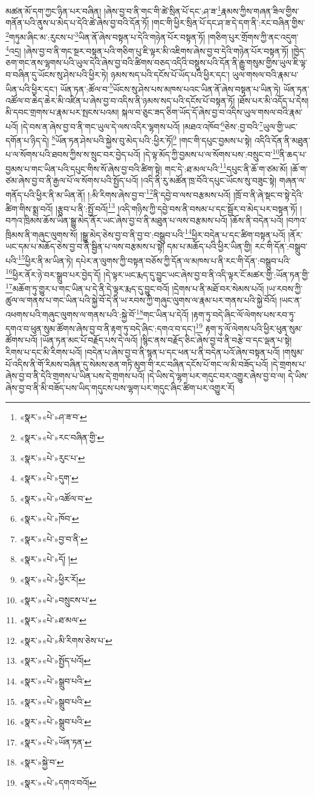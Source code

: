 མཚན་མོ་དག་ཀྱང་ཉིན་པར་བཞིན། །ཞེས་བྱ་བ་ནི་གང་གི་ཚེ་སྲིན་པོ་དང་:ཤ་ཟ་\footnote{«སྣར་»«པེ་»ཤ་ཟ་བ་}རྣམས་ཀྱིས་གཞན་ཟིལ་གྱིས་གནོན་པའི་ནུས་པ་མེད་པ་དེའི་ཚེ་ཞེས་བྱ་བའི་དོན་ཏོ། །གང་གི་ཕྱིར་སྲིན་པོ་དང་ཤ་ཟ་དེ་དག་ནི་:རང་བཞིན་གྱིས་\footnote{«སྣར་»«པེ་»རང་བཞིན་གྱི་}གཏུམ་ཞིང་མ་:རུངས་པ་\footnote{«སྣར་»«པེ་»རུང་པ་}ཡིན་ནོ་ཞེས་བསྟན་པ་དེའི་གཉེན་པོར་བསྟན་ཏོ། །གཅིག་པུར་གྲོགས་ཀྱི་ནང་འདུག་\footnote{«སྣར་»«པེ་»དུག་}འདྲ། །ཞེས་བྱ་བ་ནི་གང་སྔར་བསྟན་པའི་གཅིག་པུ་ཇི་ལྟར་མི་འཇིགས་ཞེས་བྱ་བ་དེའི་གཉེན་པོར་བསྟན་ཏོ། །ཁྱེད་ཅག་གང་ནས་ལྷགས་པའི་ཡུལ་དེའི་ཞེས་བྱ་བའི་ཚིགས་བཅད་འདིའི་བསྡུས་པའི་དོན་ནི་རྒྱུ་གསུམ་གྱིས་ཡུལ་ཇི་ལྟ་བ་བཞིན་དུ་ཡོངས་སུ་ཤེས་པའི་ཕྱིར་ཏེ། ཉམས་སད་པའི་དངོས་པོ་ཡོད་པའི་ཕྱིར་དང་། ཡུལ་གསལ་བའི་རྣམ་པ་ཡིན་པའི་ཕྱིར་དང་། ཡོན་ཏན་:ཚོལ་བ་\footnote{«སྣར་»«པེ་»འཚོལ་བ་}ཡོངས་སུ་ཤེས་པས་མཁས་པའང་ཡིན་ནོ་ཞེས་བསྟན་པ་ཡིན་ཏེ། ཡོན་ཏན་འཚོལ་བ་ཆེད་ཆེར་མི་འཛིན་པ་ཞེས་བྱ་བ་འདིས་ནི་ཉམས་སད་པའི་དངོས་པོ་བསྟན་ཏོ། །ཐོས་པར་མི་འདོད་པ་དེས། མི་དབང་གྲགས་པ་རྣམ་པར་སྤངས་པའམ། སྐལ་བ་ཅུང་ཟད་ཅིག་ཡོད་དོ་ཞེས་བྱ་བ་འདིས་ཡུལ་གསལ་བའི་རྣམ་པའོ། །དེ་བས་ན་ཞེས་བྱ་བ་ནི་གང་ཡུལ་དེ་ལས་འདིར་ལྷགས་པའོ། །མཐའ་འཁོབ་\footnote{«སྣར་»«པེ་»ཁོབ་}ཅེས་:བྱ་བའི་\footnote{«སྣར་»«པེ་»བྱ་བ་ནི་}ཡུལ་གྱི་ཡང་དགོན་པ་ཉིད་དེ། \footnote{«སྣར་»«པེ་»དོ། ། }ཡོན་ཏན་ཤེས་པའི་སྐྱེས་བུ་མེད་པའི་:ཕྱིར་ཏོ།\footnote{«སྣར་»«པེ་»ཕྱིར་རོ།} །གང་གི་དཔུང་བྱམས་པ་སྟེ། འདིའི་དོན་ནི་མཐུན་པ་ལ་སོགས་པའི་ཐབས་ཀྱིས་ས་སྲུང་བར་བྱེད་པའོ། །དེ་ལྟ་མོད་ཀྱི་བྱམས་པ་ལ་སོགས་པས་:བསྲུང་བ་\footnote{«སྣར་»«པེ་»བསྲུངས་པ་}ནི་ཆད་པ་བྱམས་པ་གང་ཡིན་པའི་དཔུང་གིས་སོ་ཞེས་བྱ་བའི་ཚིག་སྟེ། གང་དེ་:ཐ་མལ་པའི་\footnote{«སྣར་»«པེ་»ཐ་མལ་}དཔུང་ནི་ཆོ་ག་ཙམ་མོ། །ཆོ་ག་ཙམ་ཞེས་བྱ་བ་ནི་རྒྱལ་པོ་ལ་སོགས་པའི་སྤྱོད་པའོ། །འདི་ནི་རུ་མཚོན་ཁྲ་བོའི་དཔུང་ཡོངས་སུ་བཟུང་སྟེ། གཞན་ལ་གནོད་པའི་ཕྱིར་ནི་མ་ཡིན་ནོ། །:མི་རིགས་ཞེས་བྱ་བ་\footnote{«སྣར་»«པེ་»མི་རིགས་ཅེས་པ་}ནི་དབྱེ་བ་ལས་བརྩམས་པའོ། །ཁྲོ་བ་ནི་ཞེ་སྡང་བ་སྟེ་དེའི་ཚིག་གིས་སྨྲ་བའོ། །རྩུབ་པ་ནི་:སྤྱོ་བའོ།\footnote{«སྣར་»«པེ་»སྤྱོད་པའོ།} །འདི་གཉིས་ཀྱི་དབྱེ་བས་ནི་བསམ་པ་དང་སྦྱོར་བ་མེད་པར་བསྟན་ཏོ། །བཀའ་ཁྲིམས་ཆོས་ཡིན་སྒྱུ་མེད་ནོར་ཡང་ཞེས་བྱ་བ་ནི་མཐུན་པ་ལས་བརྩམས་པའོ། །ཆོས་ནི་བདེན་པའོ། །བཀའ་ཁྲིམས་ནི་གཞུང་ལུགས་སོ། །སྒྱུ་མེད་ཅེས་བྱ་བ་ནི་བྱ་བ་:བསྒྲུབ་པའི་\footnote{«སྣར་»«པེ་»སྒྲུབ་པའི་}ཕྱིར་བདེན་པ་དང་ཚིག་བསྟན་པའོ། །ནོར་ཡང་དམ་པ་མཆོད་ཅེས་བྱ་བ་ནི་སྦྱིན་པ་ལས་བརྩམས་པ་སྟེ། དམ་པ་མཆོད་པའི་ཕྱིར་ཡིན་གྱི། རང་གི་དོན་:བསྒྲུབ་པའི་\footnote{«སྣར་»«པེ་»སྒྲུབ་པའི་}ཕྱིར་ནི་མ་ཡིན་ཏེ། དཔེར་ན་ལུགས་ཀྱི་བསྟན་བཅོས་ཀྱི་དོན་ལ་མཁས་པ་ནི་རང་གི་དོན་:བསྒྲུབ་པའི་\footnote{«སྣར་»«པེ་»སྒྲུབ་པའི་}ཕྱིར་ནོར་ཉེ་བར་སྒྲུབ་པར་བྱེད་དོ། །དེ་ལྟར་ཡང་རྨད་དུ་བྱུང་ཡང་ཞེས་བྱ་བ་ནི་འདི་ལྟར་ངོ་མཚར་གྱི་:ཡོན་ཏན་གྱི་\footnote{«སྣར་»«པེ་»ཡོན་ཏན་}མཆོག་ཏུ་གྱུར་པ་གང་ཡིན་པ་དེ་ནི་དེ་ལྟར་རྨད་དུ་བྱུང་བའོ། །དྲེགས་པ་ནི་མཐོ་བར་སེམས་པའོ། །ཡ་རབས་ཀྱི་ཚུལ་ལ་གནས་པ་གང་ཡིན་པའི་སྐྱེ་བོ་དེ་ནི་ཡ་རབས་ཀྱི་གཞུང་ལུགས་ལ་རྣམ་པར་གནས་པའི་སྐྱེ་བོའོ། །ཡང་ན་འཕགས་པའི་གཞུང་ལུགས་ལ་གནས་པའི་:སྐྱེ་བོ་\footnote{«སྣར་»སྐྱེ་བ་}གང་ཡིན་པ་དེའོ། །རྟག་ཏུ་བདེ་ཞིང་ལོ་ལེགས་པས་རབ་ཏུ་དགའ་བ་ཕུན་སུམ་ཚོགས་ཞེས་བྱ་བ་ནི་རྟག་ཏུ་བདེ་ཞིང་:དགའ་བ་དང་།\footnote{«སྣར་»«པེ་»དགའ་བའོ།} རྟག་ཏུ་ལོ་ལེགས་པའི་ཕྱིར་ཕུན་སུམ་ཚོགས་པའོ། །ཡོན་ཏན་མང་པོ་བརྗོད་པས་དེ་ལའོ། །སྙིང་ནས་བརྗོད་ཅིང་ཞེས་བྱ་བ་ནི་བརྩེ་བ་དང་ལྡན་པ་སྟེ། རིགས་པ་དང་མི་རིགས་པའོ། །བདེན་པ་ཞེས་བྱ་བ་ནི་སྙན་པ་དང་ཕན་པ་ནི་བདེན་པའོ་ཞེས་བསྟན་པའོ། །གསུམ་པོ་འདིས་ནི་གོ་རིམས་བཞིན་དུ་སེམས་ཅན་གཏི་མུག་གི་རང་བཞིན་དངོས་པོ་གང་ལ་མི་བཟོད་པའོ། །དེ་གྲགས་པ་ཞེས་བྱ་བ་ནི་དེའི་གྲགས་པ་ཡིན་པས་དེ་གྲགས་པའོ། །དེ་ཡིས་དེ་ལྷག་པར་གདུང་བར་འགྱུར་ཞེས་བྱ་བ་ལ། དེ་ཡིས་ཞེས་བྱ་བ་ནི་མི་བཟོད་པས་ཡིད་གདུངས་པས་ལྷག་པར་གདུང་ཞིང་ཚིག་པར་འགྱུར་རོ། 